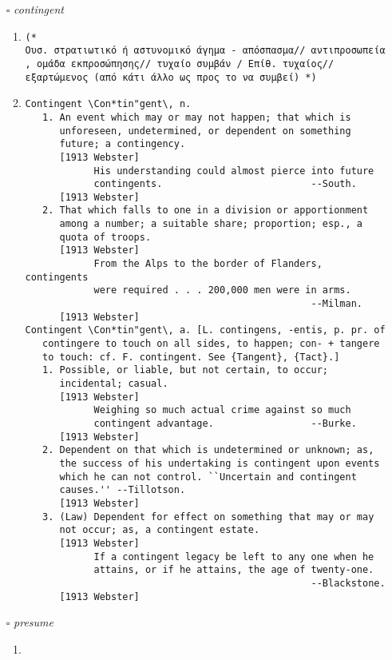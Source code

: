 \documentclass{article}
\begin{document}
\begin{itemize}
\item[$\square$] \emph{ contingent }
\begin{enumerate}
\item{
\begin{lstlisting}
(* 
Ουσ. στρατιωτικό ή αστυνομικό άγημα - απόσπασμα// αντιπροσωπεία , ομάδα εκπροσώπησης// τυχαίο συμβάν / Επίθ. τυχαίος// εξαρτώμενος (από κάτι άλλο ως προς το να συμβεί) *)
\end{lstlisting}}
\item{
\begin{lstlisting}
Contingent \Con*tin"gent\, n.
   1. An event which may or may not happen; that which is
      unforeseen, undetermined, or dependent on something
      future; a contingency.
      [1913 Webster]
            His understanding could almost pierce into future
            contingents.                          --South.
      [1913 Webster]
   2. That which falls to one in a division or apportionment
      among a number; a suitable share; proportion; esp., a
      quota of troops.
      [1913 Webster]
            From the Alps to the border of Flanders, contingents
            were required . . . 200,000 men were in arms.
                                                  --Milman.
      [1913 Webster]
Contingent \Con*tin"gent\, a. [L. contingens, -entis, p. pr. of
   contingere to touch on all sides, to happen; con- + tangere
   to touch: cf. F. contingent. See {Tangent}, {Tact}.]
   1. Possible, or liable, but not certain, to occur;
      incidental; casual.
      [1913 Webster]
            Weighing so much actual crime against so much
            contingent advantage.                 --Burke.
      [1913 Webster]
   2. Dependent on that which is undetermined or unknown; as,
      the success of his undertaking is contingent upon events
      which he can not control. ``Uncertain and contingent
      causes.'' --Tillotson.
      [1913 Webster]
   3. (Law) Dependent for effect on something that may or may
      not occur; as, a contingent estate.
      [1913 Webster]
            If a contingent legacy be left to any one when he
            attains, or if he attains, the age of twenty-one.
                                                  --Blackstone.
      [1913 Webster]
\end{lstlisting}}
\end{enumerate}
\item[$\square$] \emph{ presume }
\begin{enumerate}
\item{
\begin{lstlisting}

\end{lstlisting}}
\end{enumerate}
\end{itemize}
\end{document}
